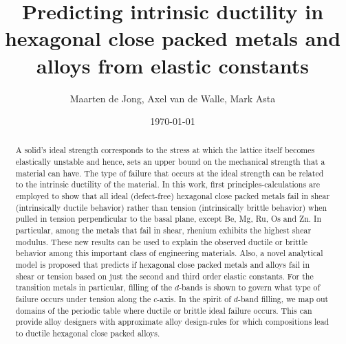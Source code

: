 \documentclass[showpacs,aps,floatfix,prb,reprint,superscriptaddress]{revtex4-1}
\begin{document}
\title{\Large Predicting intrinsic ductility in hexagonal close packed metals and alloys from elastic constants}
\author{Maarten de Jong, Axel van de Walle, Mark Asta}


\date{\today}

\begin{abstract}
A solid's ideal strength corresponds to the stress at which the lattice itself becomes elastically unstable and hence, sets an upper bound on the mechanical strength that a material can have. The type of failure that occurs at the ideal strength can be related to the intrinsic ductility of the material. In this work, first principles-calculations are employed to show that all ideal (defect-free) hexagonal close packed metals fail in shear (intrinsically ductile behavior) rather than tension (intrinsically brittle behavior) when pulled in tension perpendicular to the basal plane, except Be, Mg, Ru, Os and Zn. In particular, among the metals that fail in shear, rhenium exhibits the highest shear modulus. These new results can be used to explain the observed ductile or brittle behavior among this important class of engineering materials. Also, a novel analytical model is proposed that predicts if hexagonal close packed metals and alloys fail in shear or tension based on just the second and third order elastic constants. For the transition metals in particular, filling of the $d$-bands is shown to govern what type of failure occurs under tension along the $c$-axis. In the spirit of $d$-band filling, we map out domains of the periodic table where ductile or brittle ideal failure occurs.  This can provide alloy designers with approximate alloy design-rules for which compositions lead to ductile hexagonal close packed alloys.
\end{abstract}

\maketitle
\end{document}
